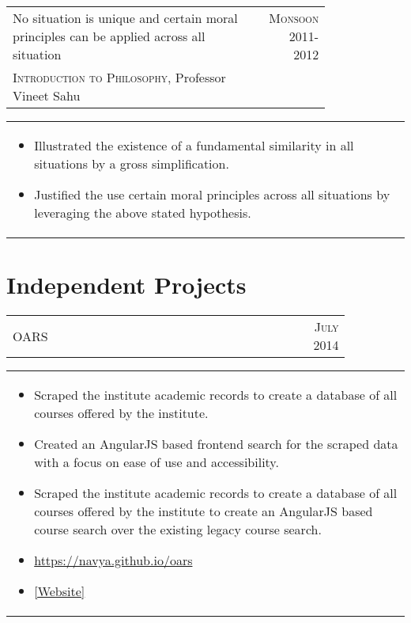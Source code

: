 \documentclass[a4paper,10pt]{article} %
\newcommand{\lproject}[4]{
    \begin{tabular}{p{0.80\linewidth}r}
        \textcolor{NavyBlue}{#2} & \multicolumn{1}{m{4cm}}{\raggedleft \textsc{#1}}\\
        #3
    \end{tabular}
    \begin{tabular}{p{\linewidth}}
    \vspace{-0.3cm}
        \footnotesize{#4}
    \end{tabular}
    \vspace{-0.5cm}
}
\newcommand{\iproject}[3]{
    \begin{tabular}{p{0.85\linewidth}r}
        \textcolor{NavyBlue}{#2} & \multicolumn{1}{m{3cm}}{\raggedleft \textsc{#1}}\\
    \end{tabular}
    \begin{tabular}{p{\linewidth}}
    \vspace{-0.3cm}
        \footnotesize{#3}
    \end{tabular}
    \vspace{-0.5cm}
}
\begin{document}
\lproject {Monsoon 2011-2012}
          {No situation is unique and certain moral principles can be applied across all situation}
          {\textsc{Introduction to Philosophy}, Professor Vineet Sahu}
          {
               \begin{itemize}[leftmargin=0.5cm]
                   \item Illustrated the existence of a fundamental similarity in all situations by a gross simplification.
                   \item Justified the use certain moral principles across all situations by leveraging the above stated hypothesis.
               \end{itemize}
           }

\section{Independent Projects}

\iproject {July 2014}
          {OARS}
          {
               \begin{itemize}[leftmargin=0.5cm]
                   \item Scraped the institute academic records to create a database of all courses offered by the institute.
                   \item Created an AngularJS based frontend search for the scraped data with a focus on ease of use and accessibility.
                   \item Scraped the institute academic records to create a database of all courses offered by the institute to create an
                       AngularJS based course search over the existing legacy course search.
                   \item \href{https://navya.github.io/oars}{https://navya.github.io/oars}
                   \item \href{https://navya.github.io/oars}{[Website]}
               \end{itemize}
           }
\end{document}
